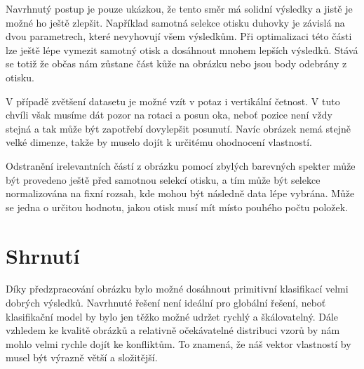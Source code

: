 \documentclass[a4paper,10pt,twocolumn]{article}
\begin{document}
Navrhnutý postup je pouze ukázkou, že tento směr má solidní výsledky a jistě je možné ho ještě zlepšit. Například samotná selekce otisku duhovky je závislá na dvou parametrech, které nevyhovují všem výsledkům. Při optimalizaci této části lze ještě lépe vymezit samotný otisk a dosáhnout mnohem lepších výsledků. Stává se totiž že občas nám zůstane část kůže na obrázku nebo jsou body odebrány z otisku.\par
V případě zvětšení datasetu je možné vzít v potaz i vertikální četnost. V tuto chvíli však musíme dát pozor na rotaci a posun oka, neboť pozice není vždy stejná a tak může být zapotřebí dovylepšit posunutí. Navíc obrázek nemá stejně velké dimenze, takže by muselo dojít k určitému ohodnocení vlastností.\par 
Odstranění irelevantních částí z obrázku pomocí zbylých barevných spekter může být provedeno ještě před samotnou selekcí otisku, a tím může být selekce normalizována na fixní rozsah, kde mohou být následně data lépe vybrána. Může se jedna o určitou hodnotu, jakou otisk musí mít místo pouhého počtu položek.

%
\section{Shrnutí}

Díky předzpracování obrázku bylo možné dosáhnout primitivní klasifikací velmi dobrých výsledků. Navrhnuté řešení není ideální pro globální řešení, neboť klasifikační model by bylo jen těžko možné udržet rychlý a škálovatelný. Dále vzhledem ke kvalitě obrázků a relativně očekávatelné distribuci vzorů by nám mohlo velmi rychle dojít ke konfliktům. To znamená, že náš vektor vlastností by musel být výrazně větší a složitější.
%


%



%
%
\end{document}
